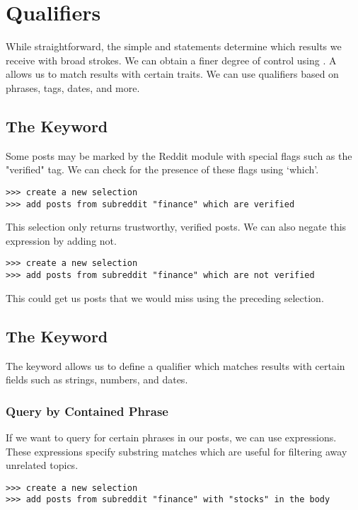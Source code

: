 \section{Qualifiers}
While straightforward, the simple  and  statements determine which results we receive with broad strokes.
We can obtain a finer degree of control using . A  allows us to match results with certain traits.
We can use qualifiers based on phrases, tags, dates, and more.



\subsection{The  Keyword}
Some posts may be marked by the Reddit module with special flags such as the "verified" tag. We can check for the presence of these flags using ‘which’.
\newline\begin{minipage}{\linewidth}\begin{lstlisting}
>>> create a new selection
>>> add posts from subreddit "finance" which are verified
\end{lstlisting}\end{minipage}

This selection only returns trustworthy, verified posts. We can also negate this expression by adding not.
\newline\begin{minipage}{\linewidth}\begin{lstlisting}
>>> create a new selection
>>> add posts from subreddit "finance" which are not verified
\end{lstlisting}\end{minipage}

This could get us posts that we would miss using the preceding selection.



\subsection{The  Keyword}
The  keyword allows us to define a qualifier which matches results with certain fields such as strings, numbers, and dates.

\subsubsection{Query by Contained Phrase}
If we want to query for certain phrases in our posts, we can use  expressions. These expressions specify substring matches which are useful for filtering away unrelated topics.
\newline\begin{minipage}{\linewidth}\begin{lstlisting}
>>> create a new selection
>>> add posts from subreddit "finance" with "stocks" in the body
\end{lstlisting}\end{minipage}

